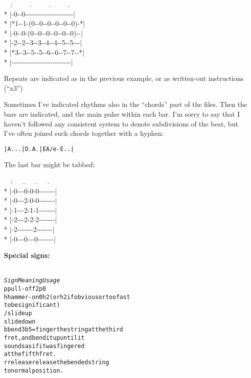 \begin{articlelayout}
\begin{pre}
\begin{adjustwidth}{2em}{0em}
~~:~~~~~.~~~~~.~~~~~.\\*
|{-}0{-}{-}0{-}{-}{-}{-}{-}{-}{-}{-}{-}{-}{-}{-}{-}{-}{-}{-}{-}{-}{-}{-}{-}|\\*
|*1{-}{-}1{-}(0{-}{-}0{-}{-}0{-}{-}0{-}{-}0{-}{-}0){-}*|\\*
|{-}0{-}{-}0{-}(0{-}{-}0{-}{-}0{-}{-}0{-}{-}0{-}{-}0){-}{-}|\\*
|{-}2{-}{-}2{-}{-}3{-}{-}3{-}{-}4{-}{-}4{-}{-}5{-}{-}5{-}{-}{-}|\\*
|*3{-}{-}3{-}{-}5{-}{-}5{-}{-}6{-}{-}6{-}{-}7{-}{-}7{-}{-}*|\\*
|{-}{-}{-}{-}{-}{-}{-}{-}{-}{-}{-}{-}{-}{-}{-}{-}{-}{-}{-}{-}{-}{-}{-}{-}{-}{-}|
\end{adjustwidth}
\end{pre}

Repeats are indicated as in the previous example, or as written-out instructions
(``x3'')

Sometimes I've indicated rhythms also in the ``{}chords''{} part of
the files. Then the bars are indicated, and the main pulse within each
bar. I'm sorry to say that I haven't followed any consistent system to
denote subdivisions of the beat, but I've often joined such chords
together with a hyphen:

\begin{alltt}| A . . . | D . A . |E A/e-E . . |\end{alltt}

The last bar might be tabbed:

\begin{pre}
\begin{adjustwidth}{2em}{0em}
~~:~~~.~~~.~~~.\\*
|{-}0{-}{-}{-}0{-}0{-}0{-}{-}{-}{-}{-}{-}{-}|\\*
|{-}0{-}{-}{-}2{-}0{-}0{-}{-}{-}{-}{-}{-}{-}|\\*
|{-}1{-}{-}{-}2{-}1{-}1{-}{-}{-}{-}{-}{-}{-}|\\*
|{-}2{-}{-}{-}2{-}2{-}2{-}{-}{-}{-}{-}{-}{-}|\\*
|{-}2{-}{-}{-}{-}{-}{-}{-}2{-}{-}{-}{-}{-}{-}{-}|\\*
|{-}0{-}{-}{-}0{-}{-}{-}0{-}{-}{-}{-}{-}{-}{-}|
\end{adjustwidth}
\end{pre}

\noindent\textbf{Special signs:}
\begin{alltt}
{\small
\textsl{Sign  Meaning     Usage}
p     pull-off    2p0
h     hammer-on   0h2 (or h2 if obvious or too fast
                       to be significant)
/     slide up
\bs     slide down
b     bend        3b5 = finger the string at the third
                        fret, and bend it up until it
                        sounds as if it was fingered
                        at the fifth fret.
r     release     release the bended string
                  to normal position.}
\end{alltt}


\end{articlelayout}
